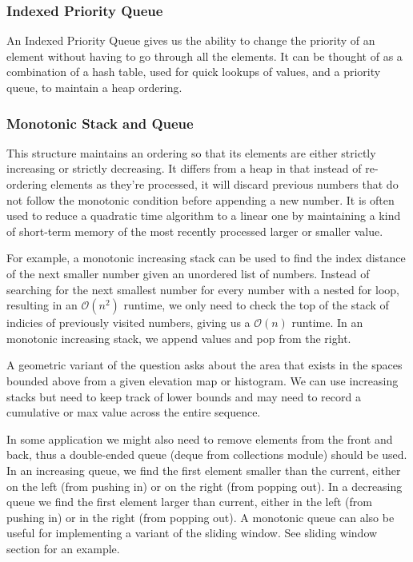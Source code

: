 \documentclass{article}
\newcommand{\bigO}{\mathcal{O}}
\begin{document}
    \subsubsection{Indexed Priority Queue}
    An Indexed Priority Queue gives us the ability to change the priority of an element without having to go through all the elements. It can be thought of as a combination of a hash table, used for quick lookups of values, and a priority queue, to maintain a heap ordering.

    \subsubsection{Monotonic Stack and Queue}
    This structure maintains an ordering so that its elements are either strictly increasing or strictly decreasing. It differs from a heap in that instead of re-ordering elements as they're processed, it will discard previous numbers that do not follow the monotonic condition before appending a new number. It is often used to reduce a quadratic time algorithm to a linear one by maintaining a kind of short-term memory of the most recently processed larger or smaller value.
    
    For example, a monotonic increasing stack can be used to find the index distance of the next smaller number given an unordered list of numbers. Instead of searching for the next smallest number for every number with a nested for loop, resulting in an $\bigO(n^2)$ runtime, we only need to check the top of the stack of indicies of previously visited numbers, giving us a $\bigO(n)$ runtime. In an monotonic increasing stack, we append values and pop from the right. 
    
    A geometric variant of the question asks about the area that exists in the spaces bounded above from a given elevation map or histogram. We can use increasing stacks but need to keep track of lower bounds and may need to record a cumulative or max value across the entire sequence.
    
    In some application we might also need to remove elements from the front and back, thus a double-ended queue (deque from collections module) should be used. In an increasing queue, we find the first element smaller than the current, either on the left (from pushing in) or on the right (from popping out). In a decreasing queue we find the first element larger than current, either in the left (from pushing in) or in the right (from popping out). A monotonic queue can also be useful for implementing a variant of the sliding window. See sliding window section for an example.
    
\end{document}
